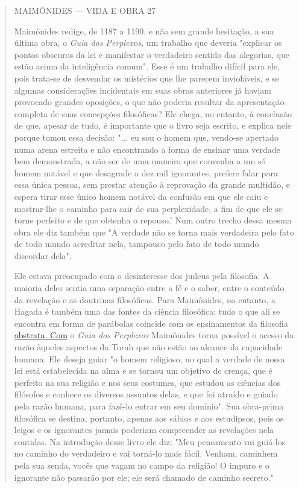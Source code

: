 \begin{quote}
MAIMÔNIDES --- VIDA E OBRA 27

Maimônides redige, de 1187 a 1190, e não sem grande hesitação, a sua
última obra, o \emph{Guia dos Perplexos,} um trabalho que deveria
"explicar os pontos obs­curos da lei e manifestar o verdadeiro sentido
das alegorias, que estão acima da inteligência comum". Esse é um
trabalho difícil para ele, pois trata-se de des­vendar os mistérios que
lhe parecem invioláveis, e se algumas considerações incidentais em suas
obras anteriores já haviam provocado grandes oposições, o que não
poderia resultar da apresentação completa de suas concepções
filo­sóficas? Ele chega, no entanto, à conclusão de que, apesar de tudo,
é importan­te que o livro seja escrito, e explica nele porque tomou essa
decisão: "... eu sou o homem que, vendo-se apertado numa arena estreita
e não encontrando a forma de ensinar uma verdade bem demonstrada, a não
ser de uma maneira que convenha a um só homem notável e que desagrade a
dez mil ignorantes, prefere falar para essa única pessoa, sem prestar
atenção à reprovação da gran­de multidão, e espera tirar esse único
homem notável da confusão em que ele caiu e mostrar-lhe o caminho para
sair de sua perplexidade, a fim de que ele se torne perfeito e de que
obtenha o repouso.' Num outro trecho dessa mes­ma obra ele diz também
que "A verdade não se torna mais verdadeira pelo fato de todo mundo
acreditar nela, tampouco pelo fato de todo mundo discordar dela".

Ele estava preocupado com o desinteresse dos judeus pela filosofia. A
maioria deles sentia uma separação entre a fé e o saber, entre o
conteúdo da revelação e as doutrinas filosóficas. Para Maimônides, no
entanto, a Hagada é também uma das fontes da ciência filosófica: tudo o
que ali se encontra em forma de parábolas coincide com os ensinamentos
da filosofia \href{http://abstrata.Com}{{abstrata. Com}} o \emph{Guia
dos Perplexos} Maimônides torna possível o acesso da razão àqueles
as­pectos da Torah que não estão ao alcance da capacidade humana. Ele
deseja guiar "o homem religioso, no qual a verdade de nossa lei está
estabelecida na alma e se tornou um objetivo de crença, que é perfeito
na sua religião e nos seus costumes, que estudou as ciências dos
filósofos e conhece os diversos as­suntos delas, e que foi atraído e
guiado pela razão humana, para fazê-lo entrar em seu domínio". Sua
obra-prima filosófica se destina, portanto, apenas aos sábios e aos
estudipsos, pois os leigos e os ignorantes jamais poderiam com­preender
as revelações nela contidas. Na introdução desse livro ele diz: "Meu
pensamento vai guiá-los no caminho do verdadeiro e vai torná-lo mais
fácil. Venham, caminhem pela sua senda, vocês que vagam no campo da
religião! O impuro e o ignorante não passarão por ele; ele será chamado
de caminho secreto."


\end{quote}
